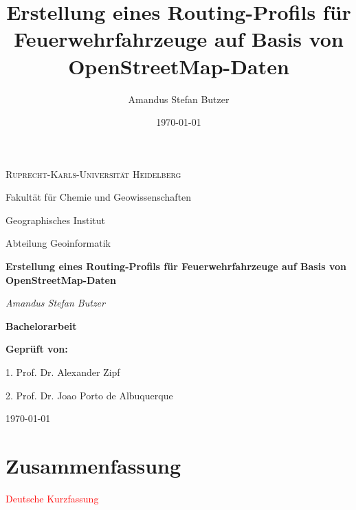 \documentclass[12pt,a4paper]{article}
\author{Amandus Stefan Butzer}
\title{Erstellung eines Routing-Profils für Feuerwehrfahrzeuge auf Basis von OpenStreetMap-Daten}
\date{\today}
\newcommand\todo[1]{\textcolor{red}{#1}}
\begin{document}


\begin{titlepage}
\begin{center}

	{\scshape\LARGE Ruprecht-Karls-Universität Heidelberg\par}
	\vspace{1.0cm}
	{\large Fakultät für Chemie und Geowissenschaften \par Geographisches Institut \par Abteilung Geoinformatik\par}
	\vspace{2.5cm}
	{\Huge\bfseries Erstellung eines Routing-Profils für Feuerwehrfahrzeuge auf Basis von OpenStreetMap-Daten\par}
	\vspace{2cm}
	{\Large\itshape Amandus Stefan Butzer\par}
	\vspace{2cm}
	{\LARGE\bfseries Bachelorarbeit\par}
	
	\vfill
	{\bfseries Geprüft von:}
	{\par 1. Prof. Dr. Alexander Zipf}
	{\par 2. Prof. Dr. Joao Porto de Albuquerque}

	\vfill

	{\large \today\par}
\end{center}
\end{titlepage}

\newpage
{}

{\centering\section*{Zusammenfassung}}
\todo{Deutsche Kurzfassung}\par
\end{document}
